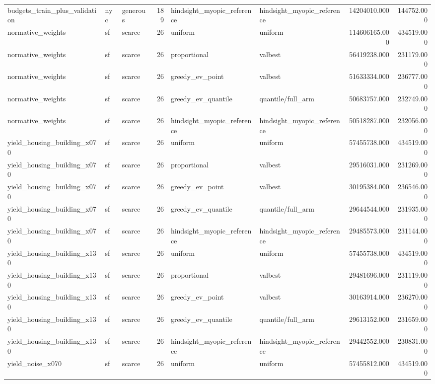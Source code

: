 \begin{tabular}{lllrllrr}
budgets\_train\_plus\_validation & nyc & generous & 189 & hindsight\_myopic\_reference & hindsight\_myopic\_reference & 14204010.000 & 144752.000 \\
normative\_weights & sf & scarce & 26 & uniform & uniform & 114606165.000 & 434519.000 \\
normative\_weights & sf & scarce & 26 & proportional & valbest & 56419238.000 & 231179.000 \\
normative\_weights & sf & scarce & 26 & greedy\_ev\_point & valbest & 51633334.000 & 236777.000 \\
normative\_weights & sf & scarce & 26 & greedy\_ev\_quantile & quantile/full\_arm & 50683757.000 & 232749.000 \\
normative\_weights & sf & scarce & 26 & hindsight\_myopic\_reference & hindsight\_myopic\_reference & 50518287.000 & 232056.000 \\
yield\_housing\_building\_x070 & sf & scarce & 26 & uniform & uniform & 57455738.000 & 434519.000 \\
yield\_housing\_building\_x070 & sf & scarce & 26 & proportional & valbest & 29516031.000 & 231269.000 \\
yield\_housing\_building\_x070 & sf & scarce & 26 & greedy\_ev\_point & valbest & 30195384.000 & 236546.000 \\
yield\_housing\_building\_x070 & sf & scarce & 26 & greedy\_ev\_quantile & quantile/full\_arm & 29644544.000 & 231935.000 \\
yield\_housing\_building\_x070 & sf & scarce & 26 & hindsight\_myopic\_reference & hindsight\_myopic\_reference & 29485573.000 & 231144.000 \\
yield\_housing\_building\_x130 & sf & scarce & 26 & uniform & uniform & 57455738.000 & 434519.000 \\
yield\_housing\_building\_x130 & sf & scarce & 26 & proportional & valbest & 29481696.000 & 231119.000 \\
yield\_housing\_building\_x130 & sf & scarce & 26 & greedy\_ev\_point & valbest & 30163914.000 & 236270.000 \\
yield\_housing\_building\_x130 & sf & scarce & 26 & greedy\_ev\_quantile & quantile/full\_arm & 29613152.000 & 231659.000 \\
yield\_housing\_building\_x130 & sf & scarce & 26 & hindsight\_myopic\_reference & hindsight\_myopic\_reference & 29442552.000 & 230831.000 \\
yield\_noise\_x070 & sf & scarce & 26 & uniform & uniform & 57455812.000 & 434519.000 \\

\end{tabular}
